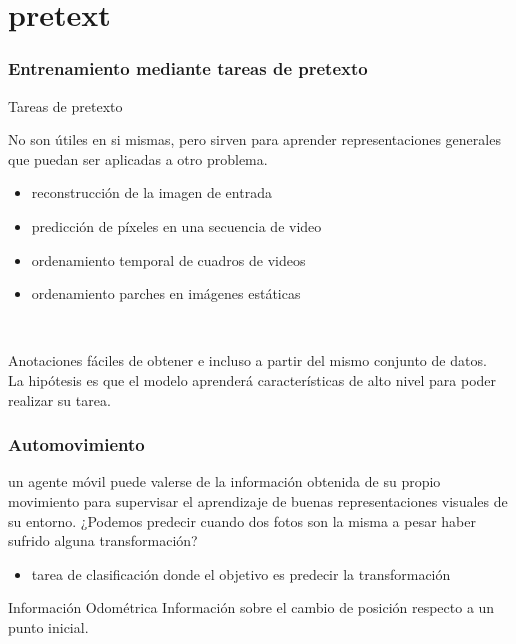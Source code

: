 \documentclass{beamer}
\begin{document}
\section{pretext}
\begin{frame}[plain]
\frametitle{Entrenamiento mediante tareas de pretexto}
Tareas de pretexto \\\vfill

No son útiles en si mismas, pero sirven para aprender representaciones generales que puedan ser aplicadas a otro problema.\\\vfill
	
\begin{itemize}
    \item reconstrucción de la imagen de entrada
    \item predicción de píxeles en una secuencia de video 
    \item ordenamiento temporal de cuadros de videos
    \item ordenamiento parches en imágenes estáticas
\end{itemize}\\
\vfill

Anotaciones fáciles de obtener e incluso a partir del mismo conjunto de datos. \\
\vfill
La hipótesis es que el modelo aprenderá características de alto nivel para poder realizar su tarea.
\vfill
\end{frame}






\begin{frame}[plain]
\frametitle{Automovimiento}
\vfill
un agente móvil puede valerse de la información obtenida de su propio movimiento para
supervisar el aprendizaje de buenas representaciones visuales de su
entorno.
\vfill
¿Podemos predecir cuando dos fotos son la misma a pesar haber sufrido alguna transformación?\\

\vfill

\begin{itemize}
    \item tarea de clasificación donde el objetivo es predecir la transformación 
\end{itemize}

\vfill

\begin{block}{Información Odométrica}
Información sobre el cambio de posición respecto a un punto inicial.
\end{block}
\vfill
\end{frame}
\end{document}
